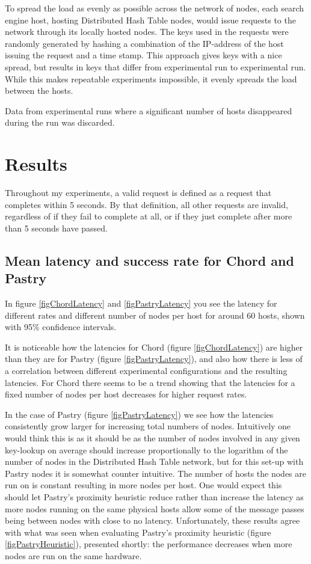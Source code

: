 To spread the load as evenly as possible across the network of nodes, each search engine host, hosting Distributed Hash Table nodes, would issue requests to the network through its locally hosted nodes.
The keys used in the requests were randomly generated by hashing a combination of the IP-address of the host issuing the request and a time stamp. This approach gives keys with a nice spread, but results in keys that differ from experimental run to experimental run. While this makes repeatable experiments impossible, it evenly spreads the load between the hosts.

Data from experimental runs where a significant number of hosts disappeared during the run was discarded.


\section{Results}
Throughout my experiments, a valid request is defined as a request that completes within 5 seconds. By that definition, all other requests are invalid, regardless of if they fail to complete at all, or if they just complete after more than 5 seconds have passed.

\subsection{Mean latency and success rate for Chord and Pastry}
In figure \ref{figChordLatency} and \ref{figPastryLatency} you see the latency for different rates and different number of nodes per host for around 60 hosts, shown with 95\% confidence intervals. 

It is noticeable how the latencies for Chord (figure \ref{figChordLatency}) are higher than they are for Pastry (figure \ref{figPastryLatency}), and also how there is less of a correlation between different experimental configurations and the resulting latencies.
For Chord there seems to be a trend showing that the latencies for a fixed number of nodes per host decreases for higher request rates.

In the case of Pastry (figure \ref{figPastryLatency}) we see how the latencies consistently grow larger for increasing total numbers of nodes. Intuitively one would think this is as it should be as the number of nodes involved in any given key-lookup on average should increase proportionally to the logarithm of the number of nodes in the Distributed Hash Table network, but for this set-up with Pastry nodes it is somewhat counter intuitive. The number of hosts the nodes are run on is constant resulting in more nodes per host. One would expect this should let Pastry's proximity heuristic reduce rather than increase the latency as more nodes running on the same physical hosts allow some of the message passes being between nodes with close to no latency.
Unfortunately, these results agree with what was seen when evaluating Pastry's proximity heuristic (figure \ref{figPastryHeuristic}), presented shortly: the performance decreases when more nodes are run on the same hardware.

